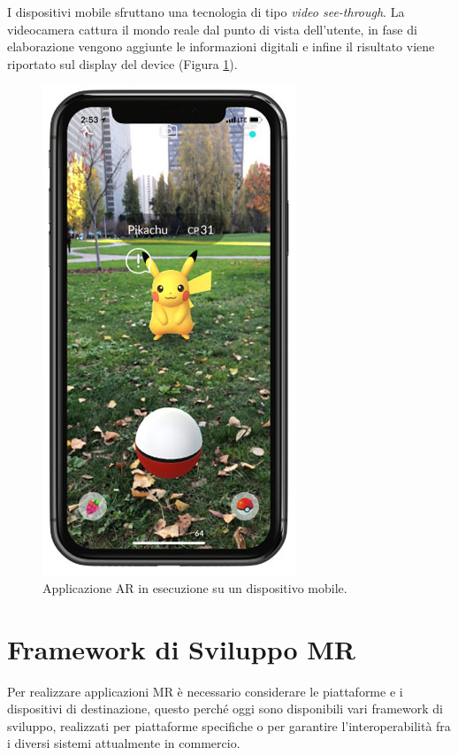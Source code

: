 I dispositivi mobile sfruttano una tecnologia di tipo \textit{video see-through}.
La videocamera cattura il mondo reale dal punto di vista dell’utente, in fase di elaborazione vengono aggiunte le informazioni digitali e infine il risultato viene riportato sul display del device (Figura \ref{fig:figure110}).
\begin{figure}[H]
    \centering
    \includegraphics[scale=0.5]{images/pokemon_go.jpg}
    \caption{Applicazione AR in esecuzione su un dispositivo mobile.}
    \label{fig:figure110}
\end{figure}

\section{Framework di Sviluppo MR}\label{sec:Sezione1.5}
Per realizzare applicazioni MR è necessario considerare le piattaforme e i dispositivi di destinazione, questo perché oggi sono disponibili vari framework di sviluppo, realizzati per piattaforme specifiche o per garantire l'interoperabilità fra i diversi sistemi attualmente in commercio.

